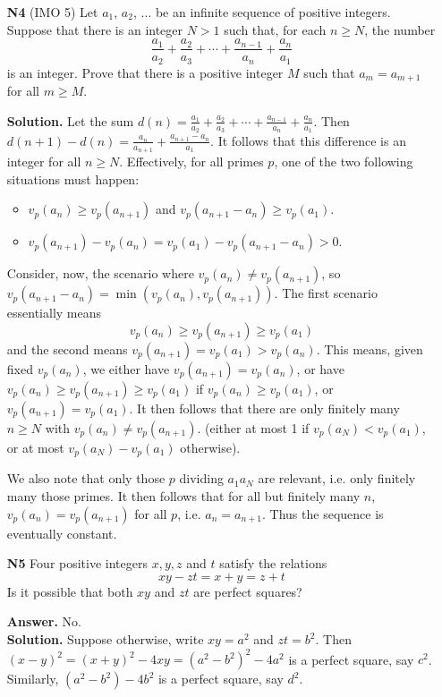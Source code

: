 \documentclass[11pt,a4paper]{article}
\begin{document}
\begin{enumerate}
	\item[\textbf{N4}] (IMO 5) 
	Let $a_1$, $a_2$, $\ldots$ be an infinite sequence of positive integers. 
	Suppose that there is an integer $N > 1$ such that, for each $n \geq N$, the number
	$$\frac{a_1}{a_2} + \frac{a_2}{a_3} + \cdots + \frac{a_{n-1}}{a_n} + \frac{a_n}{a_1}$$is an integer. 
	Prove that there is a positive integer $M$ such that $a_m = a_{m+1}$ for all $m \geq M$.
	
	\textbf{Solution.} 
	Let the sum $d(n) = \frac{a_1}{a_2} + \frac{a_2}{a_3} + \cdots + \frac{a_{n-1}}{a_n} + \frac{a_n}{a_1}$. 
	Then $d(n+1)-d(n) = \frac{a_n}{a_{n+1}} + \frac{a_{n+1}-a_n}{a_1}$. 
	It follows that this difference is an integer for all $n\ge N$. 
	Effectively, for all primes $p$, one of the two following situations must happen: 
	\begin{itemize}
		\item $v_p(a_n)\ge v_p(a_{n+1})$ and $v_p(a_{n+1}-a_n)\ge v_p(a_1)$. 
		
		\item $v_p(a_{n+1}) - v_p(a_n) = v_p(a_1)- v_p(a_{n+1}-a_n) > 0$. 
	\end{itemize}
    Consider, now, the scenario where $v_p(a_n)\neq v_p(a_{n+1})$, 
    so $v_p(a_{n+1}-a_n)=\min(v_p(a_n), v_p(a_{n+1}))$. 
    The first scenario essentially means 
    \[
    v_p(a_n)\ge v_p(a_{n+1})\ge v_p(a_1)
    \]
    and the second means $v_p(a_{n+1})=v_p(a_1)>v_p(a_n)$. 
    This means, given fixed $v_p(a_n)$, we either have $v_p(a_{n+1})=v_p(a_n)$, 
    or have $v_p(a_n)\ge v_p(a_{n+1})\ge v_p(a_1)$ 
    if $v_p(a_n)\ge v_p(a_1)$, 
    or $v_p(a_{n+1})=v_p(a_1)$.
    It then follows that there are only finitely many $n\ge N$ with $v_p(a_n)\neq v_p(a_{n+1})$. 
    (either at most 1 if $v_p(a_N) < v_p(a_1)$, or at most $v_p(a_N) - v_p(a_1)$ otherwise). 
    
    We also note that only those $p$ dividing $a_1a_N$ are relevant, 
    i.e. only finitely many those primes. 
    It then follows that for all but finitely many $n$, $v_p(a_n)=v_p(a_{n+1})$ for all $p$, 
    i.e. $a_n=a_{n+1}$. 
    Thus the sequence is eventually constant. 
	
	\item[\textbf{N5}] Four positive integers $x,y,z$ and $t$ satisfy the relations
	\[ xy - zt = x + y = z + t \]Is it possible that both $xy$ and $zt$ are perfect squares?
	
	\textbf{Answer.} No. \\
	\textbf{Solution.} Suppose otherwise, write $xy=a^2$ and $zt=b^2$. Then $(x-y)^2=(x+y)^2-4xy = (a^2-b^2)^2-4a^2$ is a perfect square, say $c^2$. Similarly, $(a^2-b^2)-4b^2$ is a perfect square, say $d^2$. 
	

\end{enumerate}
\end{document}
